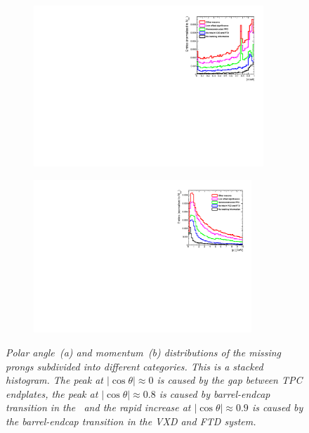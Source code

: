 \begin{figure}[h]
\centering
\begin{subfigure}{0.5\textwidth}
    \includegraphics[width=0.95\textwidth]{ILD/plots/missed-tracks.pdf}
\caption{\label{fig:MissingTracks_cos_3} }
\end{subfigure}%
  \begin{subfigure}{0.5\textwidth}
\centering
    \includegraphics[width=0.9\textwidth]{ILD/plots/missed-momentum.pdf}
\caption{\label{fig:MissingTracks_p_3} }
\end{subfigure}
    \caption{\sl Polar angle~(a) and momentum~(b) distributions of the missing prongs subdivided into different categories. This is a stacked histogram. The peak at $|\cos\theta| \approx 0 $ is caused by the gap between TPC endplates, the peak at  $|\cos\theta| \approx 0.8$ is caused by barrel-endcap transition in the \ecal\ and the rapid increase at $|\cos\theta| \approx 0.9$ is caused by the barrel-endcap transition in the VXD and FTD system. }
    \label{fig:MissingTracks_3}
\end{figure}

